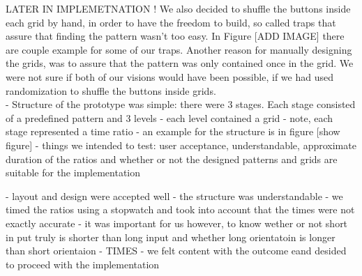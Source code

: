 LATER IN IMPLEMETNATION ! 
We also decided to shuffle the buttons inside each grid by hand, in order to have the freedom to build, so called traps that assure that finding the pattern wasn't too easy. In Figure [ADD IMAGE] there are couple example for some of our traps. Another reason for manually designing the grids, was to assure that the pattern was only contained once in the grid. We were not sure if both of our visions would have been possible, if we had used randomization to shuffle the buttons inside grids. \\



- Structure of the prototype was simple: there were 3 stages. Each stage consisted of a predefined pattern and 3 levels 
- each level contained a grid
- note, each stage represented a time ratio 
- an example for the structure is in figure [show figure]
- things we intended to test: user acceptance, understandable, approximate duration of the ratios and whether or not the designed patterns and grids are suitable for the implementation

- layout and design were accepted well 
- the structure was  understandable 
- we timed the ratios using a stopwatch and took into account that the times were not exactly accurate
- it was important for us however, to know wether or not short in put truly is shorter than long input and whether long orientatoin is longer than short orientaion
- TIMES
- we felt content with the outcome eand desided to proceed with the implementation 



